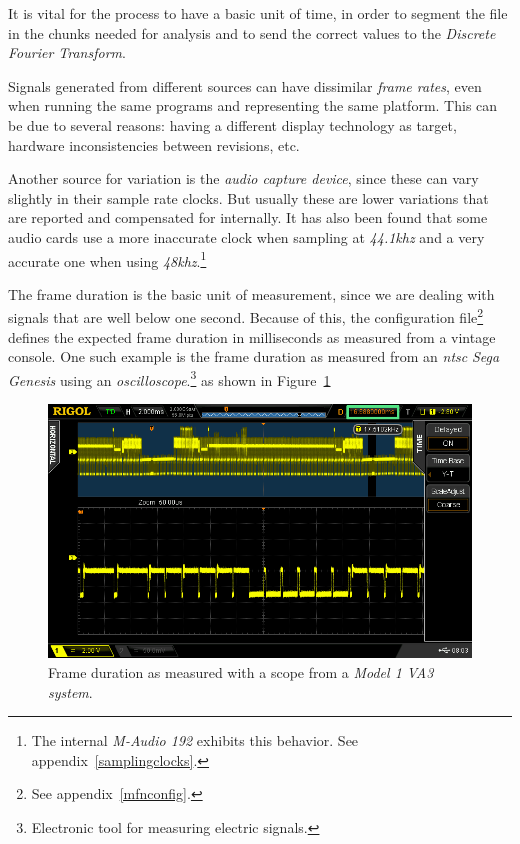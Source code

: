 \documentclass[10pt,a4paper]{report}
\newcommand{\ac}[1]{\textit{\mbox{\acrshort{#1}}}}
\newcommand{\khz}[1]{\textit{\mbox{#1\acrshort{khz}}}}
\begin{document}
\begin{appendices}
It is vital for the process to have a basic unit of time, in order to segment the file in the chunks needed for analysis and to send the correct values to the \textit{Discrete Fourier Transform}.

Signals generated from different sources can have dissimilar \textit{frame rates}, even when running the same programs and representing the same platform. This can be due to several reasons: having a different display technology as target, hardware inconsistencies between revisions, etc.

Another source for variation is the \textit{audio capture device}, since these can vary slightly in their sample rate clocks. But usually these are lower variations that are reported and compensated for internally. It has also been found that some audio cards use a more inaccurate clock when sampling at \khz{44.1} and a very accurate one when using \khz{48}.\footnote{The internal \textit{M-Audio 192} exhibits this behavior. See appendix~\ref{samplingclocks}.}

The frame duration is the basic unit of measurement, since we are dealing with signals that are well below one second. Because of this, the configuration file\footnote{See appendix~\ref{mfnconfig}.} defines the expected frame duration in milliseconds as measured from a vintage console. One such example is the frame duration as measured from an \ac{ntsc} \textit{Sega Genesis} using an \textit{oscilloscope}.\footnote{Electronic tool for measuring electric signals.} as shown in Figure~\ref{fig:frameratescope}

\begin{figure}[H]
	\centering
	\includegraphics[width=1.0\linewidth]{images/scope/framerate-scope.png}
	\caption[Scope frame rate]{Frame duration as measured with a scope from a \textit{Model 1 VA3 system}.}
	\label{fig:frameratescope}
\end{figure}


\end{appendices}
\end{document}
